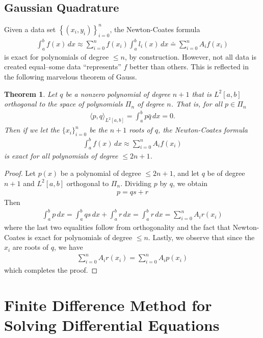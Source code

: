 \documentclass[12pt,reqno]{amsart}
\numberwithin{equation}{section}  %
\newtheorem{theorem}{Theorem}
\begin{document}
\subsection{Gaussian Quadrature}
Given a data set $ \left\{ (x_i, y_i) \right\}_{i = 0}^n $, the
Newton-Coates formula
\begin{align*}
\int_a^b f(x)\, dx \approx \sum_{i=0}^n f(x_i)\int_a^b l_i(x)\, dx 
\doteq \sum_{i=0}^n A_i f(x_i)
\end{align*}
is exact for polynomials of degree $\le n$, by construction. However, not all
data is created equal--some data ``represents'' $f$ better than others.
This is reflected in the following marvelous theorem of Gauss. 
\begin{theorem}
Let $q$ be a nonzero polynomial of degree $n + 1$ that is $L^2[a,b]$ orthogonal
to the space of polynomials $\Pi_n$ of degree $n$. That is, for all $p \in
\Pi_n$
\begin{align*}
\langle p,q \rangle_{L^2[a,b]}  = \int_a^b p \bar{q} \, dx = 0.
\end{align*}
Then if we let the $\{ x_i \}_{i=0}^{n}$ be the $n+1$ roots of $q$, the 
Newton-Coates formula
\begin{align*}
\int_a^b f(x) \, dx \approx \sum_{i=0}^n A_i f(x_i)
\end{align*}
is exact for all polynomials of degree $\le 2n + 1$.
\end{theorem}
\begin{proof}
Let $p(x)$ be a polynomial of degree $\le 2n+1$, and let $q$ be of degree
$n+1$ and $L^2[a,b]$ orthogonal to $\Pi_n$. Dividing $p$ by $q$, we obtain
\begin{align*}
p = qs + r  
\end{align*}
Then 
\begin{align*}
\int_a^b p \, dx = \int_a^b qs \, dx + \int_a^b
r \, dx = \int_a^b r \, dx = \sum_{i=0}^n A_i r(x_i) 
\end{align*}
where the last two equalities follow from orthogonality and the fact
that Newton-Coates is exact for polynomials of degree $\le n$. Lastly,
we observe that since the $x_i$ are roots of $q$, we have
\begin{align*}
\sum_{i = 0}^n A_i r(x_i) = \sum_{i=0}^n A_i p(x_i)
\end{align*}
which completes the proof. 
\end{proof}
\section{Finite Difference Method for Solving Differential Equations}
\end{document}
